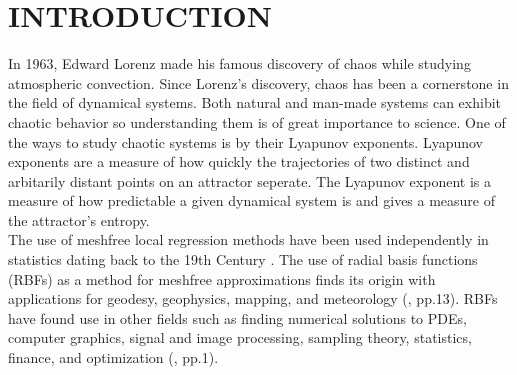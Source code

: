 %

\chapter{INTRODUCTION}
\label{chap:intro}
      In 1963, Edward Lorenz made his famous discovery of chaos while studying atmospheric convection. Since Lorenz's discovery, chaos has been
      a cornerstone in the field of dynamical systems. Both natural and man-made systems can exhibit chaotic behavior
      so understanding them is of great importance to science. One of the ways to study chaotic systems is by their Lyapunov exponents.
      Lyapunov exponents are a measure of how quickly the trajectories of two distinct and arbitarily distant points
      on an attractor seperate. The Lyapunov exponent is a measure of how predictable a given dynamical system
      is and gives a measure of the attractor's entropy.\\

      The use of meshfree local regression methods have been used independently in statistics dating back to the 19th Century \cite{item:21}.
      The use of radial basis functions (RBFs) as a method for meshfree approximations finds its origin with applications
      for geodesy, geophysics, mapping, and meteorology (\cite{item:1}, pp.13). RBFs have found use in other fields such as
      finding numerical solutions to PDEs, computer graphics, signal and image processing, sampling theory, statistics,
      finance, and optimization (\cite{item:1}, pp.1).\\

